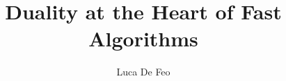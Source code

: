 \documentclass[draft,a4paper]{report}
\title{Duality at the Heart of Fast Algorithms}
\author{Luca De Feo}
\newcommand{\0}{\mathcal{O}}  %
\theoremstyle{plain}
\theoremstyle{definition}
\theoremstyle{remark}
\begin{document}
\maketitle
\tableofcontents
\listofalgorithms






\appendix


\renewcommand{\nomname}{List of Symbols}
\printnomenclature
\printindex


\end{document}

